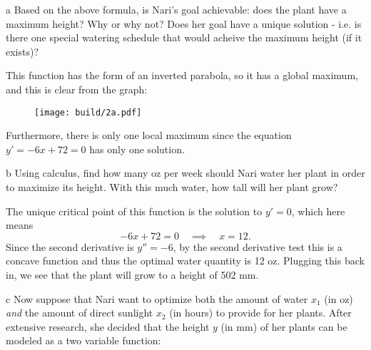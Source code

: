 \documentclass[expanded]{lkx_pset}
\begin{document}
\begin{parts}
  \begin{part}{a}
    Based on the above formula, is Nari's goal achievable: does the plant have a maximum height? Why or why not? Does her goal have a unique solution - i.e. is there one special watering schedule that would acheive the maximum height (if it exists)?

  \end{part}

  This function has the form of an inverted parabola, so it has a global maximum, and this is clear from the graph:

  \begin{figure}[ht]
    \centering
    \texttt{[image: build/2a.pdf]}
  \end{figure}\noindent
  Furthermore, there is only one local maximum since the equation $y'=-6x+72=0$ has only one solution.

  \begin{part}{b}
    Using calculus, find how many oz per week should Nari water her plant in order to maximize its height. With this much water, how tall will her plant grow?

  \end{part}

  The unique critical point of this function is the solution to $y'=0$, which here means
  \[
    -6x+72 = 0 \quad\implies \quad x = 12.
  \]
  Since the second derivative is $y''=-6$, by the second derivative test this is a concave function and 
  thus the optimal water quantity is 12 oz. Plugging this back in, we see that the plant will grow to a height of 502 mm.

  \begin{part}{c}
    Now suppose that Nari want to optimize both the amount of water $x_1$ (in oz) \textit{and} the amount of direct sunlight $x_2$ (in hours) to provide for her plants. After extensive research, she decided that the height $y$ (in mm) of her plants can be modeled as a two variable function:


\end{part}
\end{parts}
\end{document}
